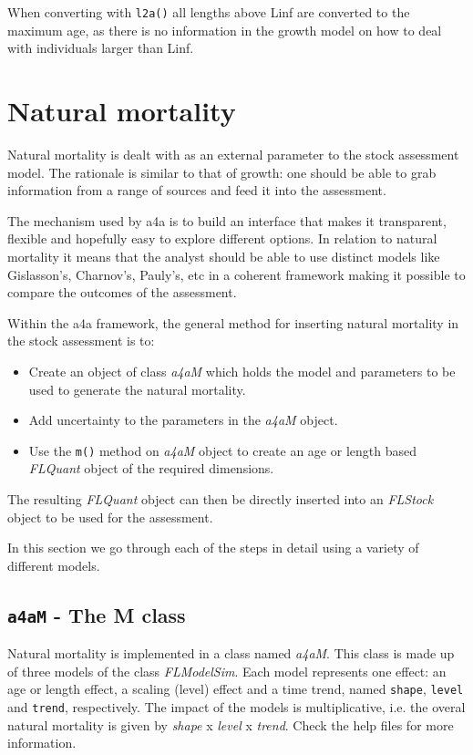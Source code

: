 \documentclass[a4paper,english,10pt]{article}\usepackage[]{graphicx}\usepackage[]{color}
\newcommand{\code}[1]{{\texttt{#1}}}
\newcommand{\class}[1]{{\textit{#1}}}
\begin{document}
When converting with \code{l2a()} all lengths above Linf are converted to the maximum age, as there is no information in the growth model on how to deal with individuals larger than Linf. 

\pagebreak
\section{Natural mortality}

Natural mortality is dealt with as an external parameter to the stock assessment model. The rationale is similar to that of growth: one should be able to grab information from a range of sources and feed it into the assessment.

The mechanism used by a4a is to build an interface that makes it transparent, flexible and hopefully easy to explore different options. In relation to natural mortality it means that the analyst should be able to use distinct models like Gislasson's, Charnov's, Pauly's, etc in a coherent framework making it possible to compare the outcomes of the assessment. 

Within the a4a framework, the general method for inserting natural mortality in the stock assessment is to:

\begin{itemize}
    \item Create an object of class \class{a4aM} which holds the model and parameters to be used to generate the natural mortality.
    \item Add uncertainty to the parameters in the \class{a4aM} object.
    \item Use the \code{m()} method on \class{a4aM} object to create an age or length based \class{FLQuant} object of the required dimensions.
\end{itemize}

The resulting \class{FLQuant} object can then be directly inserted into an \class {FLStock} object to be used for the assessment.   

In this section we go through each of the steps in detail using a variety of different models.

\subsection{\code{a4aM} - The M class}

Natural mortality is implemented in a class named \class{a4aM}. This class is made up of three models of the class \class{FLModelSim}. Each model represents one effect: an age or length effect, a scaling (level) effect and a time trend, named \code{shape}, \code{level} and \code{trend}, respectively. The impact of the models is multiplicative, i.e. the overal natural mortality is given by \class{shape} x  \class{level} x \class{trend}. Check the help files for more information.
\end{document}
